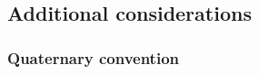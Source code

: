 \documentclass[11pt,a4paper,english,twoside]{article}
\begin{document}

\subsection{Additional considerations}
\subsubsection{Quaternary convention}
\end{document}
